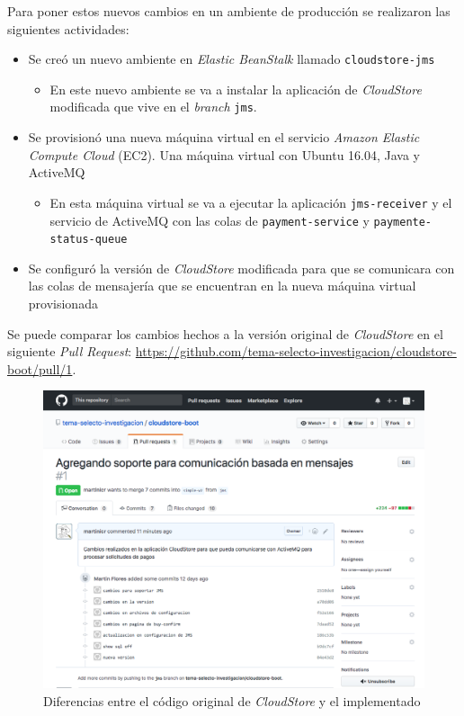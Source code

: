 \documentclass[11pt, twoside]{report}
\begin{document}
Para poner estos nuevos cambios en un ambiente de producción se realizaron las siguientes actividades:
\begin{itemize}
    \item Se creó un nuevo ambiente en \emph{Elastic BeanStalk} llamado \texttt{cloudstore-jms}
    \begin{itemize}
        \item En este nuevo ambiente se va a instalar la aplicación de \emph{CloudStore} modificada que vive en el \emph{branch} \texttt{jms}.
    \end{itemize}

    \item Se provisionó una nueva máquina virtual en el servicio \emph{Amazon Elastic Compute Cloud} (EC2). Una máquina virtual con Ubuntu 16.04, Java y ActiveMQ
    \begin{itemize}
        \item En esta máquina virtual se va a ejecutar la aplicación \texttt{jms-receiver} y el servicio de ActiveMQ con las colas de \texttt{payment-service} y \texttt{paymente-status-queue}
    \end{itemize}
    \item Se configuró la versión de \emph{CloudStore} modificada para que se comunicara con las colas de mensajería que se encuentran en la nueva máquina virtual provisionada
\end{itemize}

Se puede comparar los cambios hechos a la versión original de \emph{CloudStore} en el siguiente \emph{Pull Request}: \url{https://github.com/tema-selecto-investigacion/cloudstore-boot/pull/1}.  

\begin{figure}[h]
  \centering
  \includegraphics[width=15cm]{github-cloudstore-pr}
  \caption{\small{Diferencias entre el código original de \emph{CloudStore} y el implementado}}
  \label{fig:github-cloudstore-pr}
\end{figure}
\end{document}
